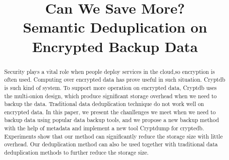 \documentclass[10pt,sigconf]{acmart}
\begin{document}
\title{Can We Save More? \\ Semantic Deduplication on Encrypted Backup Data}






\begin{abstract}

Security plays a vital role when people deploy services in the cloud,so encryption is often used. Computing over encrypted data has prove useful in such situation. Cryptdb\citep{popa2011cryptdb} is such kind of system. To support more operation on encrypted data, Cryptdb uses the multi-onion design, which produce significant storage overhead when we need to backup the data. Traditional data deduplication technique do not work well on encrypted data. In this paper, we present the chanllenges we meet when we need to backup data using popular data backup tools, and we propose a new backup method with the help of metadata and implement a new tool Cryptdump for cryptedb. Experiments show that our method can  significantly reduce the storage size with little overhead. Our deduplication method can also be used together with traditional data deduplication methods to further reduce the storage size.








\end{abstract}
\end{document}
